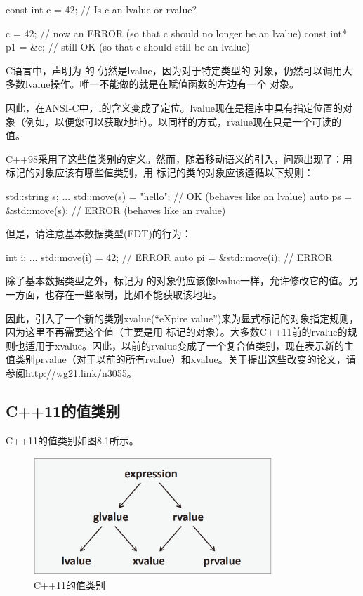 \begin{cppcode}
const int c = 42; // Is c an lvalue or rvalue?

c = 42; // now an ERROR (so that c should no longer be an lvalue)
const int* p1 = &c; // still OK (so that c should still be an lvalue)
\end{cppcode}

C语言中，声明为  的  仍然是lvalue，因为对于特定类型的  对象，仍然可以调用大多数lvalue操作。唯一不能做的就是在赋值函数的左边有一个  对象。

因此，在ANSI-C中，l的含义变成了定位。lvalue现在是程序中具有指定位置的对象（例如，以便您可以获取地址）。以同样的方式，rvalue现在只是一个可读的值。

C++98采用了这些值类别的定义。然而，随着移动语义的引入，问题出现了：用  标记的对象应该有哪些值类别，用  标记的类的对象应该遵循以下规则：

\begin{cppcode}
std::string s;
...
std::move(s) = "hello"; // OK (behaves like an lvalue)
auto ps = &std::move(s); // ERROR (behaves like an rvalue)
\end{cppcode}

但是，请注意基本数据类型(FDT)的行为：

\begin{cppcode}
int i;
...
std::move(i) = 42; // ERROR
auto pi = &std::move(i); // ERROR
\end{cppcode}

除了基本数据类型之外，标记为  的对象仍应该像lvalue一样，允许修改它的值。另一方面，也存在一些限制，比如不能获取该地址。

因此，引入了一个新的类别xvalue(“eXpire value”)来为显式标记的对象指定规则，因为这里不再需要这个值（主要是用  标记的对象）。大多数C++11前的rvalue的规则也适用于xvalue。因此，以前的rvalue变成了一个复合值类别，现在表示新的主值类别prvalue（对于以前的所有rvalue）和xvalue。关于提出这些改变的论文，请参阅\url{http://wg21.link/n3055}。

\subsection{C++11的值类别}

C++11的值类别如图8.1所示。

\begin{figure}
	\includegraphics[width=0.8\textwidth]{part1/ch8/images/1}
	\caption{C++11的值类别}
\end{figure}

